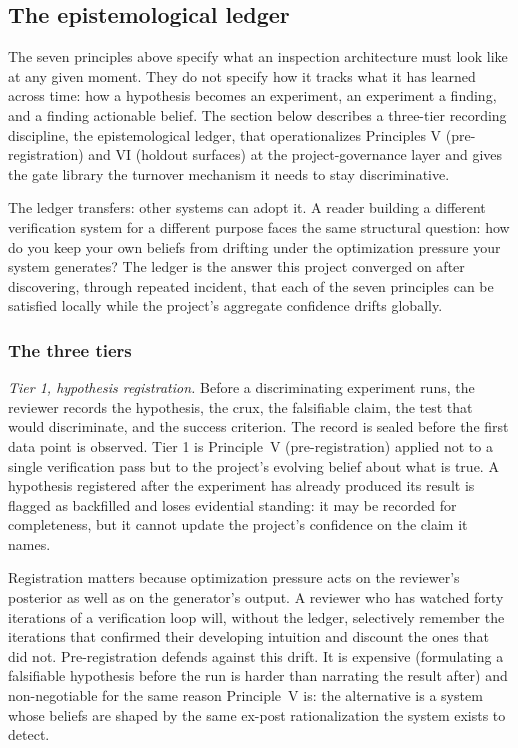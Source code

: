 \documentclass[
  11pt,
]{article}
\begin{document}
\subsection{The epistemological ledger}\label{the-epistemological-ledger-belief-under-optimization-pressure}

The seven principles above specify what an inspection architecture must
look like at any given moment. They do not specify how it
tracks what it has learned across time: how a hypothesis becomes an
experiment, an experiment a finding, and a finding
actionable belief. The section below describes a three-tier recording
discipline, the epistemological ledger, that operationalizes Principles
V (pre-registration) and VI (holdout surfaces) at the project-governance
layer and gives the gate library the turnover mechanism it needs
to stay discriminative.

The ledger transfers: other systems can adopt it. A reader building a different
verification system for a different purpose faces the same structural
question: how do you keep your own
beliefs from drifting under the optimization pressure your system
generates? The ledger is the answer this project converged
on after discovering, through repeated incident, that each of the seven
principles can be satisfied locally while the project's aggregate
confidence drifts globally.

\subsubsection{The three tiers}\label{the-three-tiers}

\emph{Tier 1, hypothesis registration.} Before a discriminating
experiment runs, the reviewer records the hypothesis, the crux,
the falsifiable claim, the test that would discriminate, and the success
criterion. The record is sealed before the first data point is observed.
Tier 1 is Principle~V (pre-registration) applied not to a single
verification pass but to the project's evolving belief about what is true.
A hypothesis registered after the experiment has already produced its
result is flagged as backfilled and loses evidential standing: it may be
recorded for completeness, but it cannot update the project's confidence
on the claim it names.

Registration matters because optimization pressure acts on the
reviewer's posterior as well as on the generator's output. A reviewer
who has watched forty iterations of a verification loop will, without
the ledger, selectively remember the iterations that confirmed their
developing intuition and discount the ones that did not.
Pre-registration defends against this drift. It is expensive
(formulating a falsifiable hypothesis before the run is harder than
narrating the result after) and non-negotiable for the same reason
Principle~V is: the alternative is a system whose beliefs
are shaped by the same ex-post rationalization the system exists to
detect.
\end{document}
